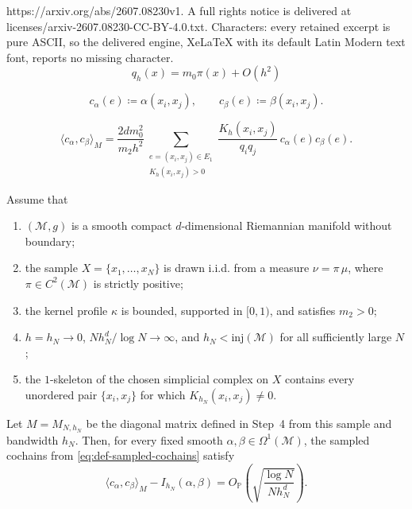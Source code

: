 \documentclass[10pt,a4paper]{amsart}
\newcommand{\mc}[1]{\mathcal{#1}}
\begin{document}
https://arxiv.org/abs/2607.08230v1. A full rights notice is delivered at licenses/arxiv-2607.08230-CC-BY-4.0.txt. Characters: every retained excerpt is pure ASCII, so the delivered engine, XeLaTeX with its default Latin Modern text font, reports no missing character.
\begin{equation}
\label{eq:kernel-mass-expansion}
q_h(x)=m_0\pi(x)+O(h^2)
\end{equation}

\begin{equation}
\label{eq:def-sampled-cochains}
c_\alpha(e)\coloneq \alpha(x_i,x_j),
\qquad
c_\beta(e)\coloneq \beta(x_i,x_j).
\end{equation}

\begin{equation}
\label{eq:discrete-inner-product-expanded}
\langle c_\alpha,c_\beta\rangle_M
=
\frac{2dm_0^2}{m_2h^2}
\sum_{\substack{e=(x_i,x_j)\in E_1\\ K_h(x_i,x_j)>0}}
\frac{K_h(x_i,x_j)}{q_iq_j}\,c_\alpha(e)c_\beta(e).
\end{equation}

\begin{proposition}
Assume that
\begin{enumerate}
\item $(\mc{M},g)$ is a smooth compact $d$-dimensional Riemannian manifold without boundary;
\item the sample $X=\{x_1,\dots,x_N\}$ is drawn i.i.d. from a measure $\nu=\pi\,\mu$, where $\pi\in C^2(\mc{M})$ is strictly positive;
\item the kernel profile $\kappa$ is bounded, supported in $[0,1)$, and satisfies $m_2>0$;
\item $h=h_N\to 0$, $N h_N^d/\log N\to \infty$, and $h_N<\mathrm{inj}(\mc{M})$ for all sufficiently large $N$;
\item the $1$-skeleton of the chosen simplicial complex on $X$ contains every unordered pair $\{x_i,x_j\}$ for which $K_{h_N}(x_i,x_j)\neq 0$.
\end{enumerate}
Let $M=M_{N,h_N}$ be the diagonal matrix defined in Step~4 from this sample and bandwidth $h_N$.
Then, for every fixed smooth $\alpha,\beta\in \Omega^1(\mc{M})$, the sampled cochains from \eqref{eq:def-sampled-cochains} satisfy
\begin{equation}
\langle c_\alpha,c_\beta\rangle_M-I_{h_N}(\alpha,\beta)
=
O_{\mathbb P}\!\left(\sqrt{\frac{\log N}{N h_N^d}}\right).
\end{equation}
\end{proposition}
\end{document}
